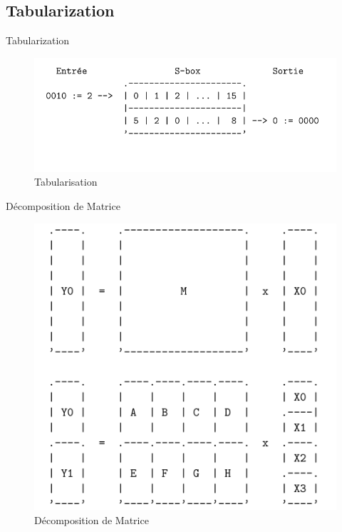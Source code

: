 \documentclass{beamer}
\begin{document}
\subsection{Tabularization}

\begin{frame}[fragile]{Tabularization}
\begin{figure}[h]
\centering
\includegraphics[scale=0.60]{images/tabu.png}
\caption{Tabularisation}
\label{fig:keygen}
\end{figure}
\end{frame}

\begin{frame}{Décomposition de Matrice}
\begin{figure}[h]
\centering
\includegraphics[scale=0.50]{images/decompo_matrice.png}
\caption{Décomposition de Matrice}
\label{fig:keygen}
\end{figure}
\end{frame}
\end{document}
